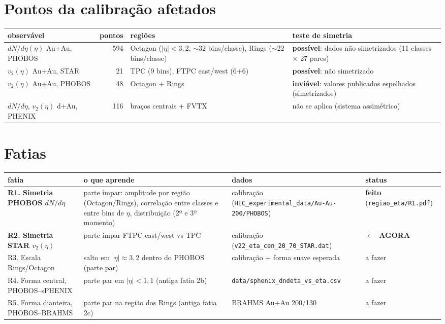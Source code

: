 \documentclass[11pt,a4paper]{article}
\newcommand{\feito}{\textcolor{green!45!black}{\textbf{feito}}}
\newcommand{\agora}{\colorbox{orange!25}{\textbf{$\leftarrow$ AGORA}}}
\newcommand{\afazer}{\textcolor{black!55}{a fazer}}
\newcommand{\inviavel}{\textcolor{red!60!black}{\textbf{inviável}}}
\newcommand{\arq}[1]{\texttt{\nolinkurl{#1}}}
\begin{document}
\section*{Pontos da calibração afetados}
\begin{tabularx}{\linewidth}{@{}Y r Y Y@{}}
\toprule
observável & pontos & regiões & teste de simetria \\
\midrule
$dN/d\eta(\eta)$ Au+Au, PHOBOS & 594 & Octagon ($|\eta|<3{,}2$, $\sim$32 bins/classe), Rings ($\sim$22 bins/classe) & \textbf{possível}: dados não simetrizados (11 classes $\times$ 27 pares) \\
$v_2(\eta)$ Au+Au, STAR & 21 & TPC (9 bins), FTPC east/west (6+6) & \textbf{possível}: não simetrizado \\
$v_2(\eta)$ Au+Au, PHOBOS & 48 & Octagon + Rings & \inviavel: valores publicados espelhados (simetrizados) \\
$dN/d\eta$, $v_2(\eta)$ d+Au, PHENIX & 116 & braços centrais + FVTX & não se aplica (sistema assimétrico) \\
\bottomrule
\end{tabularx}

\section*{Fatias}
\begin{tabularx}{\linewidth}{@{}l Y Y l@{}}
\toprule
fatia & o que aprende & dados & status \\
\midrule
\textbf{R1. Simetria PHOBOS $dN/d\eta$} & parte ímpar: amplitude por região (Octagon/Rings), correlação entre classes e entre bins de $\eta$, distribuição (2º e 3º momento) & calibração (\arq{HIC_experimental_data/Au-Au-200/PHOBOS}) & \feito{} (\arq{regiao_eta/R1.pdf}) \\
\textbf{R2. Simetria STAR $v_2(\eta)$} & parte ímpar FTPC east/west vs TPC & calibração (\arq{v22_eta_cen_20_70_STAR.dat}) & \agora \\
R3. Escala Rings/Octagon & salto em $|\eta|\approx3{,}2$ dentro do PHOBOS (parte par) & calibração + forma suave esperada & \afazer \\
R4. Forma central, PHOBOS--sPHENIX & parte par em $|\eta|<1{,}1$ (antiga fatia 2b) & \arq{data/sphenix_dndeta_vs_eta.csv} & \afazer \\
R5. Forma dianteira, PHOBOS--BRAHMS & parte par na região dos Rings (antiga fatia 2c) & BRAHMS Au+Au 200/130 & \afazer \\
\bottomrule
\end{tabularx}
\end{document}
